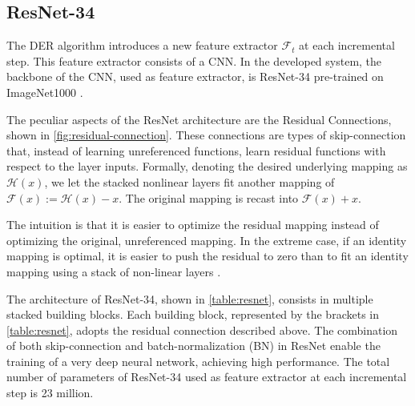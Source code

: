\subsection{ResNet-34}
\label{sec:resnet}
The DER algorithm introduces a new feature extractor $\mathcal{F}_t$ at each incremental step. This feature extractor consists of a CNN. In the developed system, the backbone of the CNN, used as feature extractor, is ResNet-34 \cite{he2016deep} pre-trained on ImageNet1000 \cite{deng2009imagenet}.

The peculiar aspects of the ResNet architecture are the Residual Connections, shown in \autoref{fig:residual-connection}. These connections are types of skip-connection that, instead of learning unreferenced functions, learn residual functions with respect to the layer inputs. Formally, denoting the desired underlying mapping as $\mathcal{H}(x)$, we let the stacked nonlinear layers fit another mapping of $\mathcal{F}(x) := \mathcal{H}(x) - x$. The original mapping is recast into $\mathcal{F}(x) + x$.

The intuition is that it is easier to optimize the residual mapping instead of optimizing the original, unreferenced mapping. In the extreme case, if an identity mapping is optimal, it is easier to push the residual to zero than to fit an identity mapping using a stack of non-linear layers \cite{he2016deep}.

The architecture of ResNet-34, shown in \autoref{table:resnet}, consists in multiple stacked building blocks. Each building block, represented by the brackets in \autoref{table:resnet}, adopts the residual connection described above.
The combination of both skip-connection and batch-normalization (BN) \cite{ioffe2015batch} in ResNet enable the training of a very deep neural network, achieving high performance.
The total number of parameters of ResNet-34 used as feature extractor at each incremental step is 23 million.

